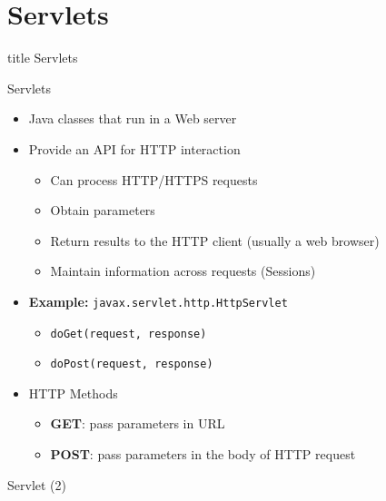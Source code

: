 \documentclass[aspectratio=169, xcolor=dvipsnames]{beamer}
\begin{document}
\section{Servlets}
\begin{frame}
  \vfill
  \centering
  \begin{beamercolorbox}[sep=8pt,center,shadow=true,rounded=true]{title}
    Servlets\par%
  \end{beamercolorbox}
  \vfill
\end{frame}

\begin{frame}{Servlets}
    \begin{itemize}[<+->]
        \item Java classes that run in a Web server
        \item Provide an API for HTTP interaction
        \begin{itemize}
            \item[$\triangleright$] Can process HTTP/HTTPS requests
            \item[$\triangleright$] Obtain parameters
            \item[$\triangleright$] Return results to the HTTP client (usually a web browser)
            \item[$\triangleright$] Maintain information across requests (Sessions)
        \end{itemize}
        \item \textbf{Example:} \texttt{javax.servlet.http.HttpServlet}
        \begin{itemize}
            \item[$\triangleright$] \texttt{doGet(request, response)}
            \item[$\triangleright$] \texttt{doPost(request, response)}
        \end{itemize}
        \item HTTP Methods
        \begin{itemize}
            \item[$\triangleright$] \textbf{GET}: pass parameters in URL
            \item[$\triangleright$] \textbf{POST}: pass parameters in the body of HTTP request
        \end{itemize}
    \end{itemize}
\end{frame}

\begin{frame}{Servlet (2)}
    \begin{center}
    \end{center}
\end{frame}
\end{document}
